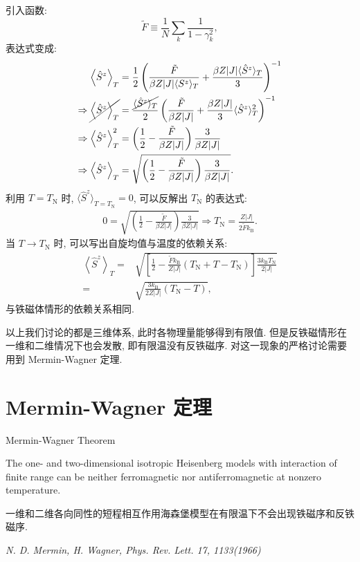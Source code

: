 引入函数:
\begin{equation}
    \tilde{F}\equiv \frac{1}{N}\sum_k\frac{1}{1-\gamma_k^2},
\end{equation}
表达式变成:
  \begin{align}
        \left\langle \hat{S}^z \right\rangle_T&=\frac{1}{2}\left( \frac{\tilde{F}}{\beta Z|J|\langle S^z \rangle_T}+\frac{\beta Z|J|\langle \hat{S}^z \rangle_T}{3} \right)^{-1}\nonumber\\
        \Rightarrow \cancel{\left\langle \hat{S}^z \right\rangle_T}&=\frac{\cancel{\langle\hat{S}^z\rangle_T}}{2}\left( \frac{\tilde{F}}{\beta Z|J|}+\frac{\beta Z|J|}{3}\langle \hat{S}^z \rangle_T^2 \right)^{-1}\nonumber\\
        \Rightarrow \left\langle \hat{S}^z \right\rangle^2_T&=\left( \frac{1}{2}-\frac{\tilde{F}}{\beta Z|J|} \right) \frac{3}{\beta Z|J|}\nonumber\\
        \Rightarrow \left\langle\hat{S}^z\right\rangle_T&=\sqrt{\left( \frac{1}{2}-\frac{\tilde{F}}{\beta Z|J|} \right) \frac{3}{\beta Z|J|}}.
    \end{align}
利用 $T=T_{\mathrm{N}}$ 时, $\langle\hat{S}^z\rangle_{T=T_{\mathrm{N}}}=0$, 可以反解出 $T_{\mathrm{N}}$ 的表达式:
\begin{equation}
    \begin{aligned}
        0=\sqrt{\left( \frac{1}{2}-\frac{\tilde{F}}{\beta Z|J|} \right) \frac{3}{\beta Z|J|}}\Rightarrow T_{\mathrm{N}}=\frac{Z|J|}{2\tilde{F}k_{\mathrm{B}}}.
    \end{aligned}
\end{equation}
当 $T\to T_{\mathrm{N}}$ 时, 可以写出自旋均值与温度的依赖关系:
  \begin{align}
        \left\langle\hat{S}^z\right\rangle_T=&\sqrt{\left[ \frac{1}{2}-\frac{\tilde{F}k_{\mathrm{B}}}{Z|J|}(T_{\mathrm{N}}+T-T_{\mathrm{N}}) \right] \frac{3k_{\mathrm{B}}T_{\mathrm{N}}}{2|J|}}\nonumber\\
        =&\sqrt{\frac{3k_{\mathrm{B}}}{2Z|J|}(T_{\mathrm{N}}-T)},
    \end{align}
与铁磁体情形的依赖关系相同.

以上我们讨论的都是三维体系, 此时各物理量能够得到有限值. 但是反铁磁情形在一维和二维情况下也会发散, 即有限温没有反铁磁序. 对这一现象的严格讨论需要用到 Mermin-Wagner 定理.

\section{Mermin-Wagner 定理}
\begin{theorem}{Mermin-Wagner Theorem}{}
    
    \qquad The one- and two-dimensional isotropic Heisenberg models with interaction of finite range can be neither ferromagnetic nor antiferromagnetic at nonzero temperature.

    \qquad 一维和二维各向同性的短程相互作用海森堡模型在有限温下不会出现铁磁序和反铁磁序.

    \textit{N. D. Mermin, H. Wagner, Phys. Rev. Lett. 17, 1133(1966)}
\end{theorem}

